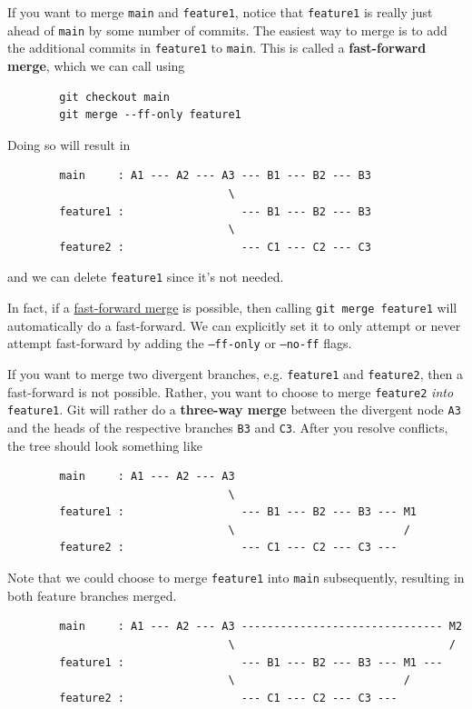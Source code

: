     \begin{definition}
      \label{def:fast-forward-merge}
      If you want to merge \texttt{main} and \texttt{feature1}, notice that \texttt{feature1} is really just ahead of \texttt{main} by some number of commits. The easiest way to merge is to add the additional commits in \texttt{feature1} to \texttt{main}. This is called a \textbf{fast-forward merge}, which we can call using 
      \begin{lstlisting}
        git checkout main 
        git merge --ff-only feature1
      \end{lstlisting} 
      Doing so will result in 
      \begin{lstlisting}
        main     : A1 --- A2 --- A3 --- B1 --- B2 --- B3
                                  \
        feature1 :                  --- B1 --- B2 --- B3
                                  \
        feature2 :                  --- C1 --- C2 --- C3
      \end{lstlisting}
      and we can delete \texttt{feature1} since it's not needed. 
    \end{definition}

    In fact, if a \hyperref[def:fast-forward-merge]{fast-forward merge} is possible, then calling \texttt{git merge feature1} will automatically do a fast-forward. We can explicitly set it to only attempt or never attempt fast-forward by adding the \texttt{--ff-only} or \texttt{--no-ff} flags. 

    \begin{definition}
      \label{def:3-way-merge}
      If you want to merge two divergent branches, e.g. \texttt{feature1} and \texttt{feature2}, then a fast-forward is not possible. Rather, you want to choose to merge \texttt{feature2} \textit{into} \texttt{feature1}. Git will rather do a \textbf{three-way merge} between the divergent node \texttt{A3} and the heads of the respective branches \texttt{B3} and \texttt{C3}. After you resolve conflicts, the tree should look something like 
      \begin{lstlisting}
        main     : A1 --- A2 --- A3
                                  \
        feature1 :                  --- B1 --- B2 --- B3 --- M1
                                  \                          /
        feature2 :                  --- C1 --- C2 --- C3 ---
      \end{lstlisting}
      Note that we could choose to merge \texttt{feature1} into \texttt{main} subsequently, resulting in both feature branches merged. 
      \begin{lstlisting}
        main     : A1 --- A2 --- A3 ------------------------------- M2
                                  \                                 /
        feature1 :                  --- B1 --- B2 --- B3 --- M1 ---
                                  \                          /
        feature2 :                  --- C1 --- C2 --- C3 ---
      \end{lstlisting}
    \end{definition}

